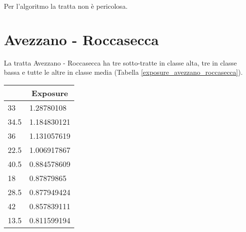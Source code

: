 Per l'algoritmo la tratta non è pericolosa.

\section{Avezzano - Roccasecca}

La tratta Avezzano - Roccasecca ha tre sotto-tratte in classe alta, tre in classe bassa e tutte le altre in classe media (Tabella \ref{exposure_avezzano_roccasecca}).

\begin{table}[H]
	\centering
	\begin{tabular}{|l|l|}
		\hline
		\rowcolor[HTML]{9B9B9B} 
		\multicolumn{1}{|c|}{\cellcolor[HTML]{9B9B9B}\textbf{Km}} & \multicolumn{1}{c|}{\cellcolor[HTML]{9B9B9B}\textbf{Exposure}} \\ \hline
		\rowcolor[HTML]{FE0000} 
		{\color[HTML]{333333} 33}                                 & {\color[HTML]{333333} 1.28780108}                              \\ \hline
		\rowcolor[HTML]{FE0000} 
		{\color[HTML]{333333} 34.5}                               & {\color[HTML]{333333} 1.184830121}                             \\ \hline
		\rowcolor[HTML]{FE0000} 
		{\color[HTML]{333333} 36}                                 & {\color[HTML]{333333} 1.131057619}                             \\ \hline
		\rowcolor[HTML]{F8FF00} 
		22.5                                                      & 1.006917867                                                    \\ \hline
		\rowcolor[HTML]{F8FF00} 
		40.5                                                      & 0.884578609                                                    \\ \hline
		\rowcolor[HTML]{F8FF00} 
		18                                                        & 0.87879865                                                     \\ \hline
		\rowcolor[HTML]{F8FF00} 
		28.5                                                      & 0.877949424                                                    \\ \hline
		\rowcolor[HTML]{F8FF00} 
		42                                                        & 0.857839111                                                    \\ \hline
		\rowcolor[HTML]{F8FF00} 
		13.5                                                      & 0.811599194                                                    \\ \hline

\end{tabular}
\end{table}
